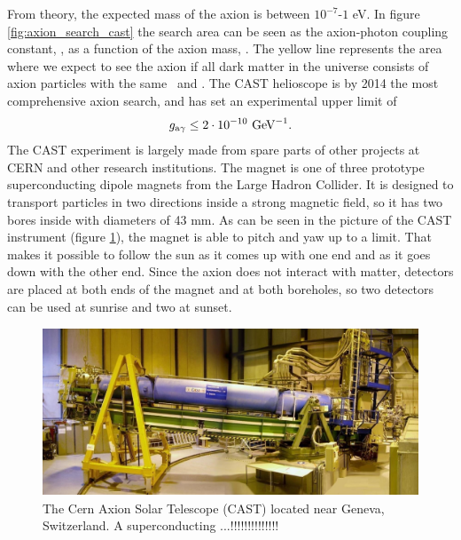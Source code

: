 From theory, the expected mass of the axion is between $10^{-7}$-$1$ eV. In figure \ref{fig:axion_search_cast} the search area can be seen as the axion-photon coupling constant, \gay, as a function of the axion mass, \maxion. The yellow line represents the area where we expect to see the axion if all dark matter in the universe consists of axion particles with the same \maxion\ and \gay. The CAST helioscope is by 2014 the most comprehensive axion search, and has set an experimental upper limit of
\begin{eqnarray}
g_{\textrm{a$\gamma$}} \leq 2 \cdot 10^{-10} \textrm{ GeV}^{-1}.
\end{eqnarray}
The CAST experiment is largely made from spare parts of other projects at CERN and other research institutions. The magnet is one of three prototype superconducting dipole magnets from the Large Hadron Collider. It is designed to transport particles in two directions inside a strong magnetic field, so it has two bores inside with diameters of 43 mm. As can be seen in the picture of the CAST instrument (figure \ref{fig:cast_instrument}), the magnet is able to pitch and yaw up to a limit. That makes it possible to follow the sun as it comes up with one end and as it goes down with the other end. Since the axion does not interact with matter, detectors are placed at both ends of the magnet and at both boreholes, so two detectors can be used at sunrise and two at sunset.

\begin{figure}[htbp]
  \centering
    \includegraphics[height=5cm]{figures/cast/cast_instrument.jpg}
  \caption{\footnotesize The Cern Axion Solar Telescope (CAST) located near Geneva, Switzerland. A superconducting ...!!!!!!!!!!!!!!}
  \label{fig:cast_instrument}
\end{figure}

